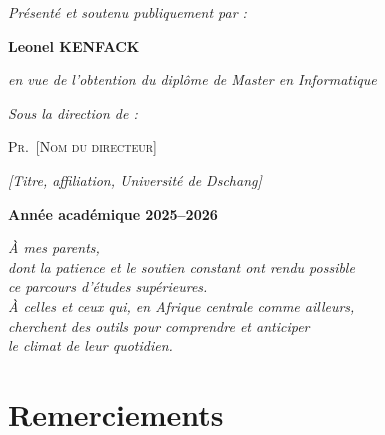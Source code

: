 \documentclass[14pt,a4paper,openany]{extreport}
\begin{document}
\begin{titlepage}
\vspace{2.5em}
{\large \textit{Présenté et soutenu publiquement par :} \par}
\vspace{0.5em}
{\Large\bfseries Leonel KENFACK \par}
\vspace{0.2em}
{\normalsize \textit{en vue de l'obtention du diplôme de Master en Informatique} \par}

\vspace{2em}
{\large \textit{Sous la direction de :} \par}
\vspace{0.4em}
{\large \textsc{Pr.~[Nom du directeur]} \par}
{\small \textit{[Titre, affiliation, Université de Dschang]} \par}

\vspace{1.5em}
{\large \textbf{Année académique 2025--2026} \par}

\end{titlepage}

\clearpage
\thispagestyle{empty}
\vspace*{4cm}
\begin{flushright}
\textit{À mes parents,}\\[0.5em]
\textit{dont la patience et le soutien constant ont rendu possible}\\[0.3em]
\textit{ce parcours d'études supérieures.}\\[1em]
\textit{À celles et ceux qui, en Afrique centrale comme ailleurs,}\\[0.3em]
\textit{cherchent des outils pour comprendre et anticiper}\\[0.3em]
\textit{le climat de leur quotidien.}\\[2em]
\end{flushright}

\clearpage
\chapter*{Remerciements}
\end{document}
